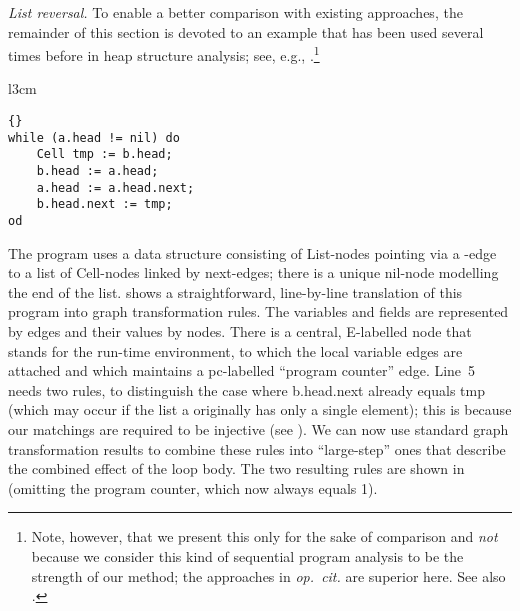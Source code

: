 \medskip\noindent\textit{List reversal.}
%
\renewcommand{\snip}[1]{\textsf{\small{#1}}}%
To enable a better comparison with existing approaches, the remainder of this
section is devoted to an example that has been used several times before in
heap structure analysis; see, e.g.,
\cite{SagRepWil98,Reyn02}.\footnote{\label{strength}Note, however, that we
present this only for the sake of comparison and \emph{not} because we consider
this kind of sequential program analysis to be the strength of our method; the
approaches in \emph{op.\ cit.} are superior here. See also .} 

\begin{wrapfigure}[6]{l}{3cm}\vspace*{-1.3\baselineskip}
\begin{lstlisting}[linewidth=4.5cm]{}
while (a.head != nil) do
    Cell tmp := b.head;
    b.head := a.head; 
    a.head := a.head.next;
    b.head.next := tmp;
od
\end{lstlisting}%
\end{wrapfigure}

\medskip
The program uses a data structure consisting of \snip{List}-nodes pointing via
a \headL-edge to a list of \snip{Cell}-nodes linked by \snip{next}-edges; there
is a unique \snip{nil}-node modelling the end of the list.
%
%
%
 shows a straightforward, line-by-line translation of this
program into graph transformation rules. The variables and fields are
represented by edges and their values by nodes. There is a central,
\snip{E}-labelled node that stands for the run-time environment, to which the
local variable edges are attached and which maintains a \snip{pc}-labelled
``program counter'' edge. Line~5 needs two rules, to distinguish the case where
\snip{b.head.next} already equals \snip{tmp} (which may occur if the list \snip
a originally has only a single element); this is because our matchings are
required to be injective (see ). We can now use standard graph
transformation results to combine these rules into ``large-step'' ones that
describe the combined effect of the loop body. The two resulting rules are
shown in  (omitting the program counter, which now always
equals \snip 1).
%
%
%

